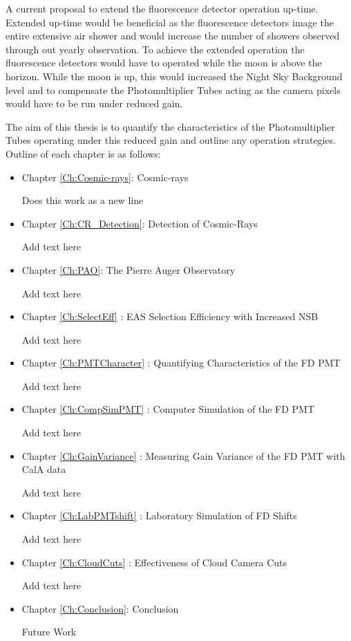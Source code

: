A current proposal to extend the fluorescence detector operation up-time. Extended up-time would be beneficial as the fluorescence detectors image the entire extensive air shower and would increase the number of showers observed through out yearly observation. To achieve the extended operation the fluorescence detectors would have to operated while the moon is above the horizon. While the moon is up, this would increased the Night Sky Background level and to compensate the Photomultiplier Tubes acting as the camera pixels would have to be run under reduced gain. 

The aim of this thesis is to quantify the characteristics of the Photomultiplier Tubes operating under this reduced gain and outline any operation strategies. Outline of each chapter is as follows:

\begin{itemize}
\item  Chapter \ref{Ch:Cosmic-rays}: Cosmic-rays

Does this work as a new line

\item Chapter \ref{Ch:CR_Detection}: Detection of Cosmic-Rays

Add text here

\item Chapter \ref{Ch:PAO}: The Pierre Auger Observatory

Add text here

\item Chapter \ref{Ch:SelectEff} : EAS Selection Efficiency with Increased NSB 

Add text here

\item Chapter \ref{Ch:PMTCharacter} : Quantifying Characteristics of the FD PMT 

Add text here

\item Chapter \ref{Ch:CompSimPMT} : Computer Simulation of the FD PMT 

Add text here

\item Chapter \ref{Ch:GainVariance} : Measuring Gain Variance of the FD PMT with CalA data 

Add text here

\item Chapter \ref{Ch:LabPMTshift} : Laboratory Simulation of FD Shifts

Add text here

\item Chapter \ref{Ch:CloudCuts} : Effectiveness of Cloud Camera Cuts

Add text here

\item Chapter \ref{Ch:Conclusion}: Conclusion 

Future Work


\end{itemize}